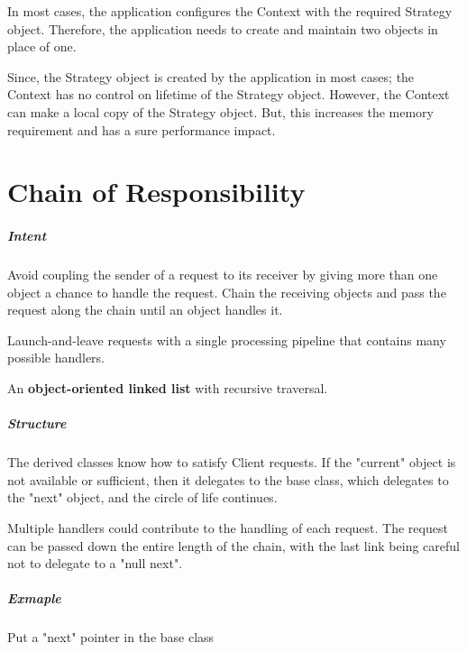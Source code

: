 \documentclass{book}
\begin{document}
    In most cases, the application configures the Context with the required Strategy object. Therefore, the application needs to create and maintain two objects in place of one.

    Since, the Strategy object is created by the application in most cases; the Context has no control on lifetime of the Strategy object.
    However, the Context can make a local copy of the Strategy object. But, this increases the memory requirement and has a sure performance impact.
\chapter{Chain of Responsibility}\label{ChainofResponsibilityPattern}

\paragraph{Intent}

    Avoid coupling the sender of a request to its receiver by giving more than one object a chance to handle the request.
    Chain the receiving objects and pass the request along the chain until an object handles it.

    Launch-and-leave requests with a single processing pipeline that contains many possible handlers.

    An \textbf{object-oriented linked list} with recursive traversal.
\paragraph{Structure}
The derived classes know how to satisfy Client requests. If the "current" object is not available or sufficient, then it delegates to the base class,
which delegates to the "next" object, and the circle of life continues.

\begin{figure}[H]
\begin{floatrow}
\end{floatrow}
\end{figure}

Multiple handlers could contribute to the handling of each request. The request can be passed down the entire length of the chain, with the last link being careful not to delegate to a "null next".

\paragraph{Exmaple }
    Put a "next" pointer in the base class
\end{document}
